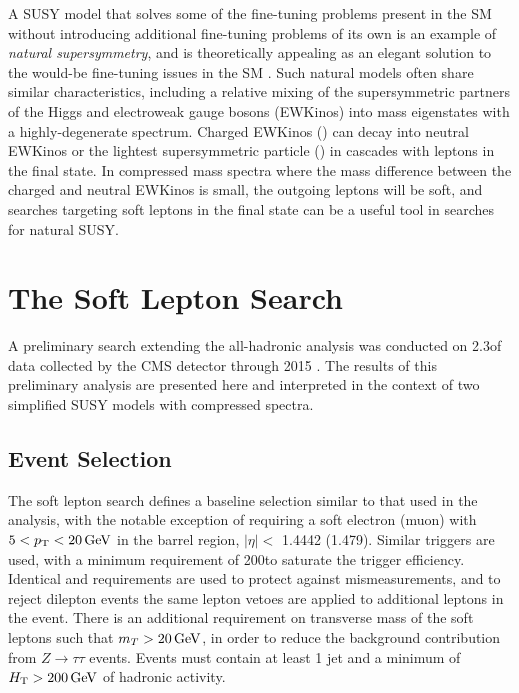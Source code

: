A SUSY model that solves some of the fine-tuning problems present in the SM without introducing additional fine-tuning problems of its own is an example of {\it natural supersymmetry}, and is theoretically appealing as an elegant solution to the would-be fine-tuning issues in the SM \cite{Casas:2014eca}. Such natural models often share similar characteristics, including a relative mixing of the supersymmetric partners of the Higgs and electroweak gauge bosons (EWKinos) into mass eigenstates with a highly-degenerate spectrum. Charged EWKinos (\chipm) can decay into neutral EWKinos or the lightest supersymmetric particle (\chiz) in cascades with leptons in the final state. In compressed mass spectra where the mass difference between the charged and neutral EWKinos is small, the outgoing leptons will be soft, and searches targeting soft leptons in the final state can be a useful tool in searches for natural SUSY.

\section{The Soft Lepton Search}
\label{sec:softlep}

A preliminary search extending the all-hadronic analysis was conducted on 2.3\fbinv of data collected by the CMS detector through 2015 \cite{CMS-PAS-SUS-16-011}. The results of this preliminary analysis are presented here and interpreted in the context of two simplified SUSY models with compressed spectra.

\subsection{Event Selection}
\label{subsec:softevents}
The soft lepton search defines a baseline selection similar to that used in the \mttwo analysis, with the notable exception of requiring a soft electron (muon) with $5 < p_{\mathrm{T}} < 20\,\text{Ge\hspace{-.08em}V}$ in the barrel region, $|\eta| <$ 1.4442 (1.479). Similar \MET triggers are used, with a minimum \MET requirement of 200\GeV to saturate the trigger efficiency. Identical \dphilong and \htovermet requirements are used to protect against \MET mismeasurements, and
to reject dilepton events the same lepton vetoes are applied to additional leptons in the event. There is an additional requirement on transverse mass of the soft leptons such that $m_T > 20\,\text{Ge\hspace{-.08em}V}$, in order to reduce the background contribution from $Z\rightarrow\tau\tau$ events. Events must contain at least 1 jet and a minimum of $H_{\mathrm{T}} > 200\,\text{Ge\hspace{-.08em}V}$ of hadronic activity.

